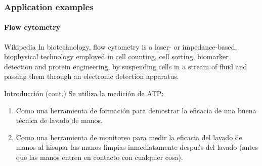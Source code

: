 \documentclass{beamer}
\begin{document}
\begin{frame}
\frametitle{Application examples}
\framesubtitle{Flow cytometry}
\begin{block}{Wikipedia}
{\scriptsize In biotechnology, flow cytometry is a laser- or impedance-based, biophysical
technology employed in cell counting, cell sorting, biomarker detection and
protein engineering, by suspending cells in a stream of fluid and passing them
through an electronic detection apparatus.} 
\end{block}
\begin{center}
\end{center}
\end{frame}

\begin{frame}
\begin{block}{Introducci\'on (cont.)}
Se utiliza la medición de ATP:
\begin{enumerate}
\item Como una herramienta de formación para demostrar la eficacia de una buena
técnica de lavado de manos.
\item Como una herramienta de monitoreo para medir la eficacia del lavado de manos
al hisopar las manos
limpias inmediatamente después del lavado (antes que las manos entren en
contacto con cualquier cosa).
\end{enumerate}
\end{block}
\end{frame} 
\end{document}
